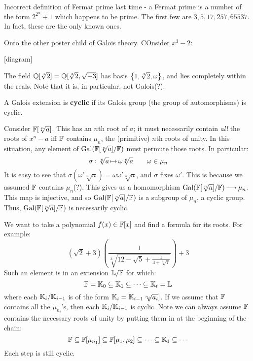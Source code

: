 Incorrect definition of Fermat prime last time - a Fermat prime is a number of
the form $ 2^{2^{\alpha}} + 1 $ which happens to be prime. The first few are
$ 3, 5, 17, 257, 65537 $. In fact, these are the only known ones.

Onto the other poster child of Galois theory. COnsider $ x^{3}-2 $:

[diagram]

The field $ \mathbb{Q}[\sqrt[3]{2}] = \mathbb{Q}[\sqrt[3]{2}, \sqrt{-3}] $ has basis
$ \left\{{1, \sqrt[3]{2}, \omega}\right\} $, and lies completely within the reals.
Note that it is, in particular, not Galois(?).

\begin{defn}
    A Galois extension is \textbf{cyclic} if its Galois group (the group of
    automorphisms) is cyclic.
\end{defn}

Consider $ \mathbb{F}[\sqrt[n]{a}] $. This has an $ n $th root of $ a $;
it must necessarily contain \textit{all} the roots of $ x^{n}-a $ iff $ \mathbb{F} $
contains $ \mu_{n} $, the (primitive) $ n $th roots of unity.
In this situation, any element of $ \operatorname{Gal}(\mathbb{F}[\sqrt[n]{a}]/\mathbb{F}) $ must permute
those roots. In particular:
\begin{equation*}
    \sigma: \sqrt[n]{a} \operatorname{\mapsto} \omega\sqrt[n]{a} \qquad \omega \in \mu_{n}
\end{equation*}
It is easy to see that $ \sigma(\omega'\sqrt[n]{a}) = \omega\omega'\sqrt[n]{a} $,
and $ \sigma $ fixes $ \omega' $. This is because we assumed $ \mathbb{F} $ contains
$ \mu_{n} $(?).
This gives us a homomorphism $ \operatorname{Gal}(\mathbb{F}[\sqrt[n]{a}]/\mathbb{F}) \operatorname{\longrightarrow} \mu_{n} $.
This map is injective, and so $ \operatorname{Gal}(\mathbb{F}[\sqrt[n]{a}]/\mathbb{F}) $ is a subgroup of
$ \mu_{n} $, a cyclic group. Thus, $ \operatorname{Gal}(\mathbb{F}[\sqrt[n]{a}]/\mathbb{F}) $ is necessarily
cyclic.

We want to take a polynomial $ f(x) \in \mathbb{F}[x] $ and find a formula for its
roots. For example:
\begin{equation*}
    (\sqrt{2} + 3)\left( \frac{1}{\sqrt[3]{12-\sqrt{5}+\frac{1}{3+\sqrt[5]{7}}}}
    \right) + 3
\end{equation*}
Such an element is in an extension $ \mathbb{L}/\mathbb{F} $ for which:
\begin{equation*}
    \mathbb{F} = \mathbb{K}_{0} \subseteq \mathbb{K}_{1} \subseteq \cdots \subseteq \mathbb{K}_{t} = \mathbb{L}
\end{equation*}
where each $ \mathbb{K}_{i}/\mathbb{K}_{i-1} $ is of the form $ \mathbb{K}_{i} = \mathbb{K}_{i-1}
\sqrt[n_{i}]{a_{i}}] $. If we assume that $ \mathbb{F} $ contains all the
$ \mu_{n_{i}} $'s, then each $ \mathbb{K}_{i}/\mathbb{K}_{i-1} $ is cyclic.
Note we can always assume $ \mathbb{F} $ contains the necessary roots of unity by
putting them in at the beginning of the chain:
\begin{equation*}
    \mathbb{F} \subseteq \mathbb{F}[\mu_{n_{1}}] \subseteq \mathbb{F}[\mu_{1}, \mu_{2}] \subseteq
    \cdots \subseteq \mathbb{K}_{1} \subseteq \cdots
\end{equation*}
Each step is still cyclic.

